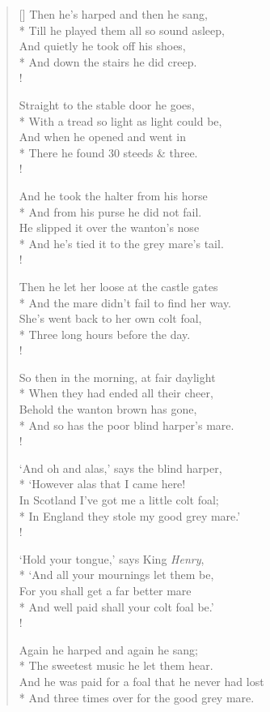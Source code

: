 \documentclass[MAIN]{subfiles}
\begin{document}
\begin{verse}[\versewidth]
Then he's harped and then he sang,\\*
\vin Till he played them all so sound asleep,\\
And quietly he took off his shoes,\\*
\vin And down the stairs he did creep.\\!

Straight to the stable door he goes,\\*
\vin With a tread so light as light could be,\\
And when he opened and went in\\*
\vin There he found 30 steeds \& three.\\!

And he took the halter from his horse\\*
\vin And from his purse he did not fail.\\
He slipped it over the wanton's nose\\*
\vin And he's tied it to the grey mare's tail.\\!

Then he let her loose at the castle gates\\*
\vin And the mare didn't fail to find her way.\\
She's went back to her own colt foal,\\*
\vin Three long hours before the day.\\!

So then in the morning, at fair daylight\\*
\vin When they had ended all their cheer,\\
Behold the wanton brown has gone,\\*
\vin And so has the poor blind harper's mare.\\!

`And oh and alas,' says the blind harper,\\*
\vin `However alas that I came here!\\
In Scotland I've got me a little colt foal;\\*
\vin In England they stole my good grey mare.'\\!

`Hold your tongue,' says King \emph{Henry},\\*
\vin `And all your mournings let them be,\\
For you shall get a far better mare\\*
\vin And well paid shall your colt foal be.'\\!

Again he harped and again he sang;\\*
\vin The sweetest music he let them hear.\\
And he was paid for a foal that he never had lost\\*
\vin And three times over for the good grey mare.
\end{verse}
\end{document}
